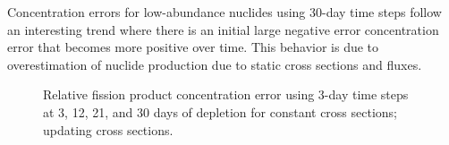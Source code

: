     Concentration errors for low-abundance nuclides using 30-day time steps follow
    an interesting trend where there is an initial large negative error
    concentration error that becomes more positive over time. This behavior is due
    to overestimation of nuclide production due to static cross sections and
    fluxes.

    \begin{figure}[h!tpb]
        \centering
        \caption[]{Relative fission product concentration error using 3-day time
            steps at 3, 12, 21, and 30 days of depletion for
             constant cross sections;
             updating cross sections.}
    \end{figure}

